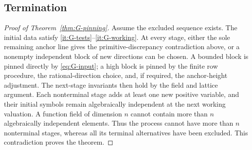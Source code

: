 \subsection{Termination}

\begin{proof}[Proof of Theorem~\ref{thm:G-pinning}]
Assume the excluded sequence exists.  The initial data satisfy
\ref{it:G-tests}--\ref{it:G-working}.  At every stage, either the sole
remaining anchor line gives the primitive-discrepancy contradiction
above, or a nonempty independent block of new directions can be chosen.
A bounded block is pinned directly by \eqref{eq:G-input}; a high block
is pinned by the finite row procedure, the rational-direction choice,
and, if required, the anchor-height adjustment.  The next-stage
invariants then hold by the field and lattice argument.  Each
nonterminal stage adds at least one new positive variable, and their
initial symbols remain algebraically independent at the next working
valuation.  A function field of dimension $n$ cannot contain more than
$n$ algebraically independent elements.  Thus the process cannot have
more than $n$ nonterminal stages, whereas all its terminal alternatives
have been excluded.  This contradiction proves the theorem.
\end{proof}
